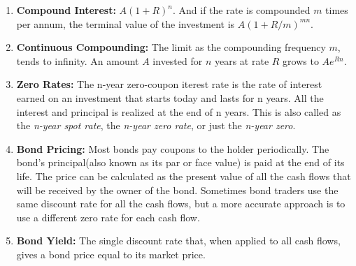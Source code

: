 \begin{enumerate}
\begin{enumerate}
        \item \textbf{SOFR:} Reference rate in the US.
        \item \textbf{SONIA:} Stirling Overnight Index Average. Reference rate in UK.
        \item Longer rates such as three-month rates, six-month rates, or one-year rates can be determined from overnight rates by compounding them daily.
        \item If the annualized SOFR on the $ith$ business day of a period is $r_i (1 \leq i \leq n)$ and the rate applies to $d_i$ days. The annualised interest rate for the period is 
        $$\left(\prod_{i = 1}^{n} \left( 1 + \frac{r_i. d_i}{360} \right) - 1 \right) \frac{360}{D}$$
        Where $d_i$ is the number of days the rate applies. ($1$ for weekdays, and $3$ for Fridays), and $D$ is the total days in the period.
        \item LIBORs are forward looking as they are determined at the beginning of the period to which they apply. SOFR, SONIA, etc are backward looking.
    \end{enumerate}
    \item \textbf{Compound Interest:} $A(1 + R)^n$. And if the rate is compounded $m$ times per annum, the terminal value of the investment is $A(1 + R/m)^{mn}$.
    \item \textbf{Continuous Compounding:} The limit as the compounding frequency $m$, tends to infinity. An amount $A$ invested for $n$ years at rate $R$ grows to $A e^{Rn}$.
    \item \textbf{Zero Rates:} The n-year zero-coupon iterest rate is the rate of interest earned on an investment that starts today and lasts for n years. All the interest and principal is realized at the end of n years. This is also called as the \textit{n-year spot rate}, the \textit{n-year zero rate}, or just the \textit{n-year zero}.
    \item \textbf{Bond Pricing:} Most bonds pay coupons to the holder periodically. The bond's principal(also known as its par or face value) is paid at the end of its life. The price can be calculated as the present value of all the cash flows that will be received by the owner of the bond. 
    Sometimes bond traders use the same discount rate for all the cash flows, but a more accurate approach is to use a different zero rate for each cash flow.
    \item \textbf{Bond Yield:} The single discount rate that, when applied to all cash flows, gives a bond price equal to its market price.

\end{enumerate}
